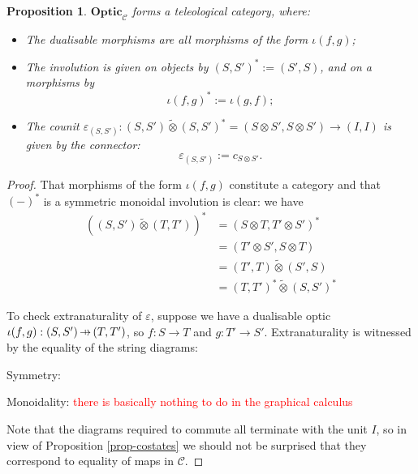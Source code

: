 \documentclass[11pt,a4paper]{article}
\theoremstyle{plain}
\newtheorem{proposition}[theorem]{Proposition}
\theoremstyle{definition}
\newcommand{\C}{\mathscr{C}}
\newcommand{\Optic}{\mathbf{Optic}}
\newcommand{\switched}{\mathbin{\tilde{\otimes}}}
\newcommand{\hto}{\ensuremath{\,\mathaccent\shortmid\rightarrow\,}}
\newcommand{\todo}[1]{\textcolor{red}{\small #1}}
\begin{document}
\begin{proposition}
$\Optic_\C$ forms a teleological category, where:
\begin{itemize}
\item The dualisable morphisms are all morphisms of the form $\iota(f, g)$;
\item The involution is given on objects by $(S, S')^* := (S', S)$, and on a morphisms by \[\iota(f, g)^* := \iota(g, f);\]
\item The counit $\varepsilon_{(S, S')} : (S, S') \switched (S, S')^* = (S \otimes S', S \otimes S') \to (I, I)$ is given by the connector: \[\varepsilon_{(S, S')} := c_{S \otimes S'}.\]
\end{itemize}
\end{proposition}
\begin{proof}
That morphisms of the form $\iota(f, g)$ constitute a category and that $(-)^*$ is a symmetric monoidal involution is clear: we have
\begin{align*}
\left( (S, S') \switched (T, T') \right)^* 
&= \left( S \otimes T, T' \otimes S' \right)^* \\
&= \left(T' \otimes S', S \otimes T  \right) \\
&= (T', T) \switched (S', S) \\
&= (T, T')^* \switched (S, S')^*
\end{align*}

To check extranaturality of $\varepsilon$, suppose we have a dualisable optic $\iota(f, g) : (S, S') \hto (T, T')$, so $f : S \to T$ and $g : T' \to S'$. Extranaturality is witnessed by the equality of the string diagrams:
\begin{center}

\qquad \raisebox{1.5cm}{$=$} \qquad 

\end{center}
Symmetry:
\begin{center}

\qquad \raisebox{1.5cm}{$=$} \qquad 

\end{center}
Monoidality: \todo{there is basically nothing to do in the graphical calculus}

Note that the diagrams required to commute all terminate with the unit $I$, so in view of Proposition \ref{prop-costates} we should not be surprised that they correspond to equality of maps in $\C$.
\end{proof}

\end{document}
